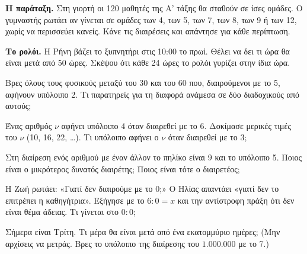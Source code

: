 \ex \textbf{Η παράταξη.} Στη γιορτή οι 120 μαθητές της Α’ τάξης θα σταθούν σε ίσες ομάδες. Ο γυμναστής ρωτάει αν γίνεται σε ομάδες των 4, των 5, των 7, των 8, των 9 ή των 12, χωρίς να περισσεύει κανείς. Κάνε τις διαιρέσεις και απάντησε για κάθε περίπτωση.

\ex \textbf{Το ρολόι.} Η Ρήνη βάζει το ξυπνητήρι στις 10:00 το πρωί. Θέλει να δει τι ώρα θα είναι μετά από 50 ώρες. Σκέψου ότι κάθε 24 ώρες το ρολόι γυρίζει στην ίδια ώρα.


\ex Βρες όλους τους φυσικούς μεταξύ του 30 και του 60 που, διαιρούμενοι με το 5, αφήνουν υπόλοιπο 2. Τι παρατηρείς για τη διαφορά ανάμεσα σε δύο διαδοχικούς από αυτούς;

\ex Ένας αριθμός $\nu$ αφήνει υπόλοιπο 4 όταν διαιρεθεί με το 6. Δοκίμασε μερικές τιμές του $\nu$ (10, 16, 22, \dots). Τι υπόλοιπο αφήνει ο $\nu$ όταν διαιρεθεί με το 3;

\ex Στη διαίρεση ενός αριθμού με έναν άλλον το πηλίκο είναι 9 και το υπόλοιπο 5. Ποιος είναι ο μικρότερος δυνατός διαιρέτης; Ποιος είναι τότε ο διαιρετέος;

\ex Η Ζωή ρωτάει: «Γιατί δεν διαιρούμε με το 0;» Ο Ηλίας απαντάει «γιατί δεν το επιτρέπει η καθηγήτρια». Εξήγησε με το $6:0=x$ και την αντίστροφη πράξη ότι δεν είναι θέμα άδειας. Τι γίνεται στο $0:0$;

\ex Σήμερα είναι Τρίτη. Τι μέρα θα είναι μετά από ένα εκατομμύριο ημέρες; (Μην αρχίσεις να μετράς. Βρες το υπόλοιπο της διαίρεσης του $1.000.000$ με το 7.)
